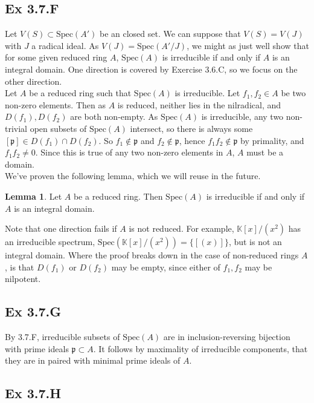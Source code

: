 \documentclass{article}
\theoremstyle{definition}
\newtheorem{lemma}[theorem]{Lemma}
\newcommand{\K}{\mathbb{K}}
\newcommand{\Spec}{\text{Spec}}
\begin{document}
\subsection*{Ex 3.7.F}

Let $V(S) \subset \Spec(A')$ be an closed set. We can suppose that $V(S) =
	V(J)$ with $J$ a radical ideal. As $V(J) = \Spec(A'/J)$, we might as just well
show that for some given reduced ring $A$, $\Spec(A)$ is irreducible if and
only if $A$ is an integral domain. One direction is covered by Exercise 3.6.C,
so we focus on the other direction. \\

Let $A$ be a reduced ring such that $\Spec(A)$ is irreducible.  Let $f_1, f_2
	\in A$ be two non-zero elements. Then as $A$ is reduced, neither lies in the
nilradical, and $D(f_1), D(f_2)$ are both non-empty. As $\Spec(A)$ is
irreducible, any two non-trivial open subsets of $\Spec(A)$ intersect, so there
is always some $[\mathfrak{p}] \in D(f_1) \cap D(f_2)$. So $f_1 \not \in
	\mathfrak{p}$ and $f_2 \not \in \mathfrak{p}$, hence $f_1f_2 \not \in
	\mathfrak{p}$ by primality, and $f_1f_2 \not = 0$. Since this is true of any
two non-zero elements in $A$, $A$ must be a domain. \\

We've proven the following lemma, which we will reuse in the future.
\begin{lemma}
	Let $A$ be a reduced ring. Then $\Spec(A)$ is irreducible if and only if
	$A$ is an integral domain.
\end{lemma}

Note that one direction fails if $A$ is not reduced. For example, $\K[x]/(x^2)$
has an irreducible spectrum, $\Spec(\K[x]/(x^2)) = \{[(x)]\}$, but is not an
integral domain. Where the proof breaks down in the case of non-reduced rings
$A$, is that $D(f_1)$ or $D(f_2)$ may be empty, since either of $f_1, f_2$ may
be nilpotent.


\subsection*{Ex 3.7.G}

By 3.7.F, irreducible subsets of $\Spec(A)$ are in inclusion-reversing
bijection with prime ideals $\mathfrak{p} \subset A$. It follows by maximality
of irreducible components, that they are in paired with minimal prime ideals of
$A$.

\subsection*{Ex 3.7.H}
\end{document}
